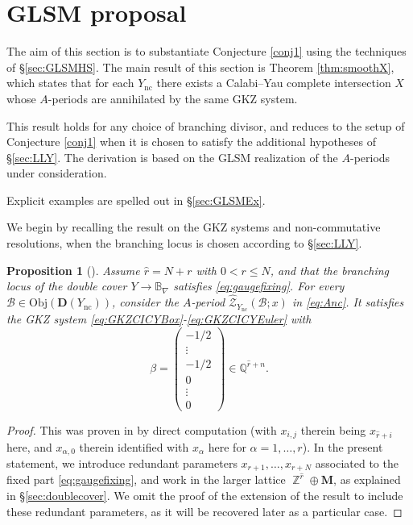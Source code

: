 \documentclass[12pt,a4paper,oneside]{amsart}
\numberwithin{equation}{section}
\newtheorem{prop}[thm]{Proposition}
\theoremstyle{definition}
\theoremstyle{remark}
\DeclareMathOperator{\Z}{\mathbb{Z}}
\newcommand{\cB}{\mathbb{B}}
\newcommand{\Br}{\mathcal{B}}
\newcommand{\Ync}{Y_{\mathrm{nc}}}
\newcommand{\pz}{\widehat{\mathcal{Z}}}
\newcommand{\DC}{\mathbf{D}}
\begin{document}
\section{GLSM proposal}
\label{sec:mainGLSM}

The aim of this section is to substantiate Conjecture \ref{conj1} using the techniques of \S\ref{sec:GLSMHS}. 
The main result of this section is Theorem \ref{thm:smoothX}, which states that for each $\Ync$ there exists a Calabi--Yau 
complete intersection $X$ whose $A$-periods are annihilated by the same GKZ system.\par
This result holds for any choice of branching divisor, and reduces to the setup of Conjecture \ref{conj1} 
when it is chosen to satisfy the additional hypotheses of \S\ref{sec:LLY}. The derivation is based on the GLSM realization of the $A$-periods under consideration.\par 
Explicit examples are spelled out in \S\ref{sec:GLSMEx}.


We begin by recalling the result on the GKZ systems and non-commutative resolutions, when the branching locus is chosen according to \S\ref{sec:LLY}.
\begin{prop}[{\cite[Theorem~4.12]{Lee:2023piu}}]
\label{prop:GLSMAYnc}
	Assume $\hat{r}=N+r$ with $0 < r \le N$, and that the branching locus of the double cover $Y \longrightarrow \cB_{\nabla}$ satisfies \eqref{eq:gaugefixing}. For every $\Br \in \mathrm{Obj} \left( \DC (\Ync) \right)$, consider the $A$-period $\pz_{\Ync} (\Br; x)$ in \eqref{eq:Anc}. It satisfies the GKZ system \eqref{eq:GKZCICYBox}-\eqref{eq:GKZCICYEuler} with  
	\begin{equation*}
		\beta = \left( \begin{matrix} -1/2 \\ \vdots \\ -1/2 \\ 0 \\ \vdots \\ 0\end{matrix} \right) \in \mathbb{Q}^{\hat{r}+n} .
	\end{equation*}
\end{prop}
\begin{proof}This was proven in \cite[\S4.3]{Lee:2023piu} by direct computation (with $x_{i,j}$ therein being $x_{\hat{r}+i}$ here, and $x_{\alpha,0}$ therein identified with $x_{\alpha}$ here for $\alpha=1, \dots, r$). In the present statement, we introduce redundant parameters $x_{r+1}, \dots, x_{r+N}$ associated to the fixed part \eqref{eq:gaugefixing}, and work in the larger lattice $\Z^{\hat{r}} \oplus \mathbf{M}$, as explained in \S\ref{sec:doublecover}. We omit the proof of the extension of the result to include these redundant parameters, as it will be recovered later as a particular case.
\end{proof}
\end{document}

